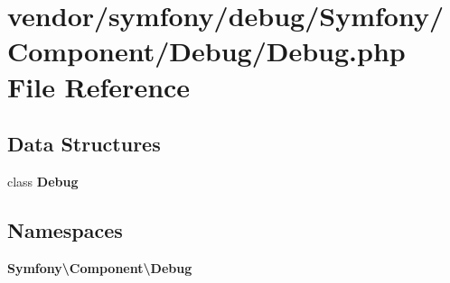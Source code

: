 \section{vendor/symfony/debug/\+Symfony/\+Component/\+Debug/\+Debug.php File Reference}
\label{_debug_8php}
\subsection*{Data Structures}
\begin{DoxyCompactItemize}
\item 
class {\bf Debug}
\end{DoxyCompactItemize}
\subsection*{Namespaces}
\begin{DoxyCompactItemize}
\item 
 {\bf Symfony\textbackslash{}\+Component\textbackslash{}\+Debug}
\end{DoxyCompactItemize}
